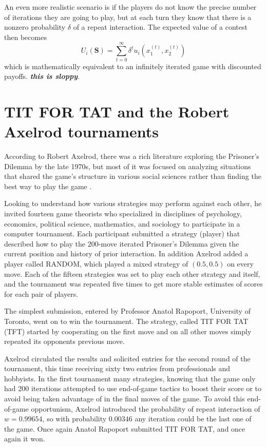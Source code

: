 An even more realistic scenario is if the players do not know the precise number of iterations they are going to play, but at each turn they know that there is a nonzero probability $\delta$ of a repeat interaction. The expected value of a contest then becomes
\[
U_i(\mathbf{S}) = \sum_{t=0}^\infty \delta^t u_i\left(x^{(t)}_1, x^{(t)}_2\right)
\]
which is mathematically equivalent to an infinitely iterated game with discounted payoffs. \textit{\textbf{this is sloppy}}.

\chapter{TIT FOR TAT and the Robert Axelrod tournaments}

According to Robert Axelrod, there was a rich literature exploring the Prisoner's Dilemma by the late 1970s, but most of it was focused on analyzing situations that shared the game's structure in various social sciences rather than finding the best way to play the game \cite[p.28]{axelrod1984evolution}. 

Looking to understand how various strategies may perform against each other, he invited fourteen game theorists who specialized in disciplines of psychology, economics, political science, mathematics, and sociology to participate in a computer tournament. Each participant submitted a strategy (player) that described how to play the 200-move iterated Prisoner's Dilemma given the current position and history of prior interaction. In addition Axelrod added a player called RANDOM, which played a mixed strategy of $(0.5, 0.5)$ on every move. Each of the fifteen strategies was set to play each other strategy and itself, and the tournament was repeated five times to get more stable estimates of scores for each pair of players.

The simplest submission, entered by Professor Anatol Rapoport, University of Toronto, went on to win the tournament. The strategy, called TIT FOR TAT (TFT) started by cooperating on the first move and on all other moves simply repeated its opponents previous move.

Axelrod circulated the results and solicited entries for the second round of the tournament, this time receiving sixty two entries from professionals and hobbyists. In the first tournament many strategies, knowing that the game only had 200 iterations attempted to use end-of-game tactics to boost their score or to avoid being taken advantage of in the final moves of the game. To avoid this end-of-game opportunism, Axelrod introduced the probability of repeat interaction of $w = 0.99654$, so with probability $0.00346$ any iteration could be the last one of the game. Once again Anatol Rapoport submitted TIT FOR TAT, and once again it won.

